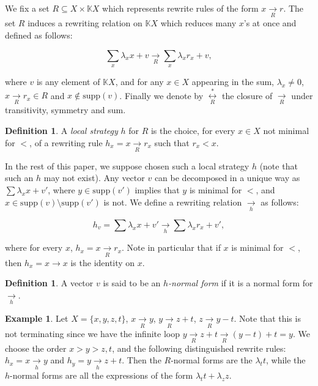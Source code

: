 \documentclass[10pt]{easychair}
\theoremstyle{definition}
\newtheorem{definition}[theorem]{Definition}
\newtheorem{example}[theorem]{Example}
\newcommand\supp{\text{supp}}
\newcommand\K{\mathbb{K}}
\newcommand\KX{\K X}
\newcommand\rewR{\underset{R}{\longrightarrow}}
\newcommand\rewh{\underset{h}{\longrightarrow}}
\newcommand\equivR{\underset{R}{\overset{*}{\longleftrightarrow}}}
\begin{document}
\medskip

We fix a set $R\subseteq X\times\KX$ which represents rewrite rules of
the form $x\rewR r$. The set $R$ induces a rewriting relation on $\KX$ which reduces many $x$'s at once and defined as follows:
\begin{small}
  \begin{equation}\label{equ:rewriting_step}
    \sum_x\lambda_xx+v\rewR\sum_x\lambda_xr_x+v,
  \end{equation}
\end{small}
where $v$ is any element of $\KX$, and for any $x \in X$ appearing in the sum,  $\lambda_x\neq 0$, $x\rewR r_x\in R$ and $x\notin\supp(v)$.
Finally we denote by $\equivR$ the closure of $\rewR$ under transitivity, symmetry and sum.

\begin{definition}
  A \emph{local strategy} $h$ for $R$ is the choice, for every $x \in X$ not minimal for $<$, of a rewriting rule $h_x=x \rewR r_x$ such that $r_x < x$. 
\end{definition}

In the rest of this paper, we suppose chosen such a local strategy $h$ (note that such an $h$ may not exist). 
Any vector $v$ can be decomposed in a unique way as
$\sum\lambda_xx+v'$, where $y\in\supp(v')$ implies that $y$ is minimal
for $<$, and $x\in\supp(v)\setminus\supp(v')$ is not. We define a rewriting
relation $\rewh$ as follows:
\begin{small}
  \begin{equation}\label{equ:well-formed_rewriting_step}
    h_v = \sum\lambda_xx+v'\rewh\sum\lambda_xr_x+v',
  \end{equation}
\end{small}
where for every $x$, $h_x=x \rewR r_x$. Note in particular that if $x$ is minimal for $<$, then $h_x = x \to x$ is the identity on $x$.

\medskip

\begin{definition}
  A vector $v$ is said to be an \emph{$h$-normal form} if it is a normal
  form for $\rewh$.
\end{definition}


\begin{example}\label{ex:h_norma_form}
  Let $X=\{x,y,z,t\}$, $x\rewR y$, $y \rewR z + t$, $z \rewR y - t$. Note that this is not terminating since we have the infinite loop $y \rewR z + t \rewR (y - t) + t = y$. We choose the order $x > y > z,t$, and the following distinguished rewrite rules: $h_x = x \rewh y$ and $h_y = y \rewh z + t$. Then the $R$-normal forms are the $\lambda_t t$, while the $h$-normal forms are all the expressions of the form $\lambda_t t + \lambda_z z$.
\end{example}
\end{document}
